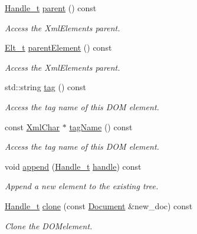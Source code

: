 \begin{DoxyCompactItemize}
\hyperlink{class_d_d4hep_1_1_x_m_l_1_1_handle__t}{Handle\+\_\+t} \hyperlink{class_d_d4hep_1_1_x_m_l_1_1_element_ae4de44fe9105de7b9eedf4c7f6e41c89}{parent} () const
\begin{DoxyCompactList}\small\item\em Access the Xml\+Elements parent. \end{DoxyCompactList}\item 
\hyperlink{class_d_d4hep_1_1_x_m_l_1_1_element_af63782f6873c3d8c9b28e1777cde9275}{Elt\+\_\+t} \hyperlink{class_d_d4hep_1_1_x_m_l_1_1_element_af28f2ccbfc60353c8a1bff393c13e64a}{parent\+Element} () const
\begin{DoxyCompactList}\small\item\em Access the Xml\+Elements parent. \end{DoxyCompactList}\item 
std\+::string \hyperlink{class_d_d4hep_1_1_x_m_l_1_1_element_ade0bb178aee242e967d48be672c66b1d}{tag} () const
\begin{DoxyCompactList}\small\item\em Access the tag name of this D\+OM element. \end{DoxyCompactList}\item 
const \hyperlink{namespace_d_d4hep_1_1_x_m_l_a09e5d9cc86ed782f6826dfe0778c1815}{Xml\+Char} $\ast$ \hyperlink{class_d_d4hep_1_1_x_m_l_1_1_element_ad976880d3f947fc78b841ff64fcffbca}{tag\+Name} () const
\begin{DoxyCompactList}\small\item\em Access the tag name of this D\+OM element. \end{DoxyCompactList}\item 
void \hyperlink{class_d_d4hep_1_1_x_m_l_1_1_element_a5a6061e7c307966b99fc8ea50196d2c6}{append} (\hyperlink{class_d_d4hep_1_1_x_m_l_1_1_handle__t}{Handle\+\_\+t} \hyperlink{_geant4_converter_8cpp_a3789cd8800e1433fb917a1d6f85ef67d}{handle}) const
\begin{DoxyCompactList}\small\item\em Append a new element to the existing tree. \end{DoxyCompactList}\item 
\hyperlink{class_d_d4hep_1_1_x_m_l_1_1_handle__t}{Handle\+\_\+t} \hyperlink{class_d_d4hep_1_1_x_m_l_1_1_element_a9e2b0d580529920c58c998251658b904}{clone} (const \hyperlink{class_d_d4hep_1_1_x_m_l_1_1_document}{Document} \&new\+\_\+doc) const
\begin{DoxyCompactList}\small\item\em Clone the D\+O\+Melement. \end{DoxyCompactList}\item 

\end{DoxyCompactItemize}
